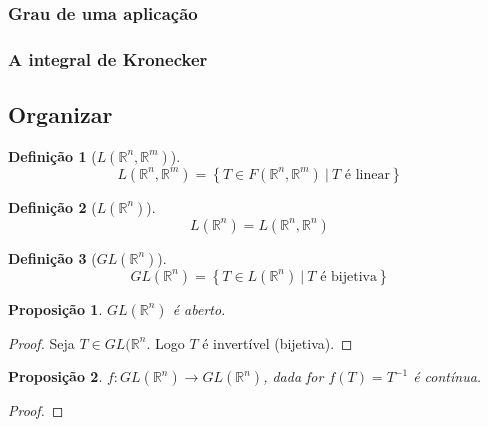 \documentclass{article}
\newtheorem{prop}{Proposição}[section]
\theoremstyle{theorem}
\theoremstyle{lemma}
\theoremstyle{definition}
\newtheorem{definicao}{Definição}[section]
\theoremstyle{remark}
\begin{document}
   \subsubsection{Grau de uma aplicação}
   \subsubsection{ A integral de Kronecker}
\subsection{Organizar}
\begin{definicao}[$L(\mathbb{R}^n, \mathbb{R}^m)$]
	$$L(\mathbb{R}^n, \mathbb{R}^m) = \left\{ T \in F(\mathbb{R}^n, \mathbb{R}^m) \: | \: T \text{ é linear}\right\}$$
\end{definicao}
\begin{definicao}[$L(\mathbb{R}^n)$]
	$$L(\mathbb{R}^n) = L(\mathbb{R}^n, \mathbb{R}^n)$$
\end{definicao}
\begin{definicao}[$GL(\mathbb{R}^n)$]
	$$GL(\mathbb{R}^n) = \left\{ T \in L(\mathbb{R}^n) \: | \: T \text{ é bijetiva}\right\}$$
\end{definicao}
\begin{prop}
	$GL(\mathbb{R}^n)$ é aberto.
\end{prop}
\begin{proof}
	Seja $T\in GL(\mathbb{R}^n$. Logo $T$ é  invertível (bijetiva). 
\end{proof}
\begin{prop}
	$f:GL(\mathbb{R}^n) \to GL(\mathbb{R}^n)$, dada for $f(T) = T^{-1}$ é contínua.
\end{prop}
\begin{proof}
\end{proof}
\end{document}
